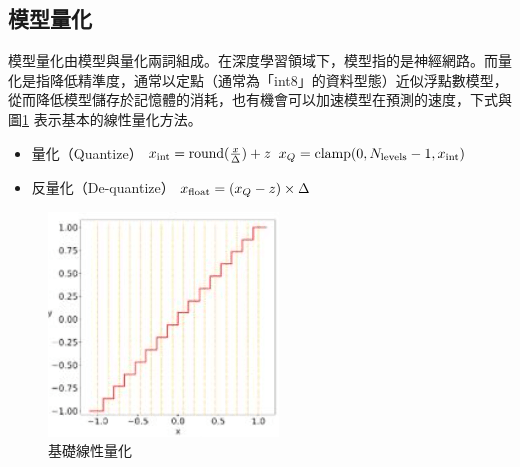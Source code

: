 \subsection{模型量化}
模型量化由模型與量化兩詞組成。在深度學習領域下，模型指的是神經網路。而量化是指降低精準度，通常以定點（通常為「int8」的資料型態）近似浮點數模型，從而降低模型儲存於記憶體的消耗，也有機會可以加速模型在預測的速度，下式與圖\ref{quantization1} 表示基本的線性量化方法。

\begin{itemize}
    \item 量化（Quantize）
    \subitem $x_\textup{int} = \textup{round}(\frac{x}{\Delta})+z$
    \subitem $x_Q = \textup{clamp}(0,N_\textup{levels}-1,x_\textup{int})$
    \item 反量化（De-quantize）
    \subitem $x_\textup{float} = (x_Q-z)\times\Delta$
\end{itemize}
\begin{figure}[htbp]
    \hfil
    \begin{minipage}[t]{0.4\textwidth}
        \includegraphics[width=\textwidth]{./figures/chapter02_method/quantization1.png}
        \caption {基礎線性量化}
        \label{quantization1}
    \end{minipage}
    \hfil
\end{figure}

